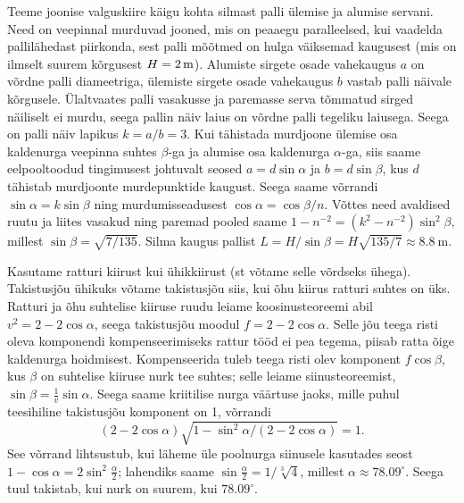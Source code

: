 \documentclass[10pt]{article}
\begin{document}

\solu
\par
Teeme joonise valguskiire käigu kohta silmast palli ülemise ja alumise servani. Need on veepinnal murduvad jooned, mis on peaaegu paralleelsed, kui vaadelda pallilähedast piirkonda, sest palli mõõtmed on hulga väiksemad kaugusest (mis on ilmselt suurem kõrgusest $H=\SI 2\m$). Alumiste sirgete osade vahekaugus $a$ on võrdne palli diameetriga, ülemiste sirgete osade vahekaugus $b$ vastab palli näivale kõrgusele. Ülaltvaates palli vasakusse ja paremasse serva tõmmatud sirged näiliselt ei murdu, seega pallin näiv laius on võrdne palli tegeliku laiusega. Seega on palli näiv lapikus $k=a/b=3$. Kui tähistada murdjoone ülemise osa kaldenurga veepinna suhtes $\beta$-ga ja alumise osa kaldenurga $\alpha$-ga, siis saame eelpooltoodud tingimusest johtuvalt seosed $a=d\sin\alpha$ ja $b=d\sin\beta$, kus $d$ tähistab murdjoonte murdepunktide kaugust. Seega saame võrrandi $\sin\alpha=k\sin\beta$ ning murdumisseadusest  $\cos\alpha=\cos\beta/n$. Võttes need avaldised ruutu ja liites vasakud ning paremad pooled saame $1-n^{-2}=(k^2-n^{-2})\sin^2\beta$, millest $\sin\beta=\sqrt{7/135}$. Silma kaugus pallist $L=H/\sin\beta=H\sqrt{135/7}\approx\SI{8.8}\m$.
\probend
\bigskip


\solu
Kasutame ratturi kiirust kui ühikkiirust (st võtame selle võrdseks ühega). Takistusjõu ühikuks võtame takistusjõu siis, kui õhu kiirus ratturi suhtes on üks. Ratturi ja õhu suhtelise kiiruse ruudu leiame koosinusteoreemi abil $v^2=2-2\cos\alpha$, seega takistusjõu moodul  $f=2-2\cos\alpha$. Selle jõu teega risti oleva komponendi kompenseerimiseks rattur tööd ei pea tegema, piisab ratta õige kaldenurga hoidmisest. Kompenseerida tuleb teega risti olev komponent $f\cos\beta$, kus $\beta$ on suhtelise kiiruse nurk tee suhtes; selle leiame siinusteoreemist, $\sin\beta=\frac 1v\sin\alpha$. Seega saame kriitilise nurga väärtuse jaoks, mille puhul teesihiline takistusjõu komponent on 1, võrrandi
$$(2-2\cos\alpha)\sqrt{1-\sin^2\alpha/(2-2\cos\alpha)}=1.$$
See võrrand lihtsustub, kui läheme üle poolnurga siinusele kasutades seost $1-\cos\alpha=2\sin^2\frac\alpha 2$; lahendiks saame  $\sin\frac\alpha 2= 1/\sqrt[3]4$, millest $\alpha\approx 78.09^\circ$. Seega tuul takistab, kui nurk on suurem, kui $78.09^\circ$.
\probend
\bigskip
\end{document}
